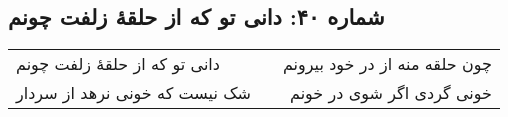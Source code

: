 \begin{center}
\section*{شماره ۴۰: دانی تو که از حلقۀ زلفت چونم}
\label{sec:040}
\begin{longtable}{l p{0.5cm} r}
دانی تو که از حلقهٔ زلفت چونم
&&
چون حلقه منه از در خود بیرونم
\\
شک نیست که خونی نرهد از سردار
&&
خونی گردی اگر شوی در خونم
\\
\end{longtable}
\end{center}
